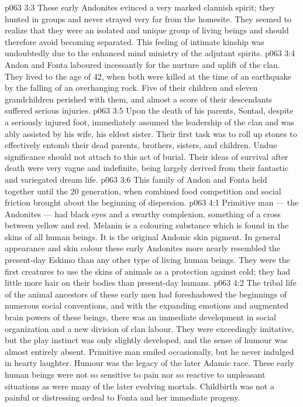 \vs p063 3:3 These early Andonites evinced a very marked clannish spirit; they hunted in groups and never strayed very far from the homesite. They seemed to realize that they were an isolated and unique group of living beings and should therefore avoid becoming separated. This feeling of intimate kinship was undoubtedly due to the enhanced mind ministry of the adjutant spirits.
\vs p063 3:4 \pc Andon and Fonta laboured incessantly for the nurture and uplift of the clan. They lived to the age of 42, when both were killed at the time of an earthquake by the falling of an overhanging rock. Five of their children and eleven grandchildren perished with them, and almost a score of their descendants suffered serious injuries.
\vs p063 3:5 Upon the death of his parents, Sontad, despite a seriously injured foot, immediately assumed the leadership of the clan and was ably assisted by his wife, his eldest sister. Their first task was to roll up stones to effectively entomb their dead parents, brothers, sisters, and children. Undue significance should not attach to this act of burial. Their ideas of survival after death were very vague and indefinite, being largely derived from their fantastic and variegated dream life.
\vs p063 3:6 \pc This family of Andon and Fonta held together until the 20 generation, when combined food competition and social friction brought about the beginning of dispersion.
\vs p063 4:1 Primitive man --- the Andonites --- had black eyes and a swarthy complexion, something of a cross between yellow and red. Melanin is a colouring substance which is found in the skins of all human beings. It is the original Andonic skin pigment. In general appearance and skin colour these early Andonites more nearly resembled the present\hyp{}day Eskimo than any other type of living human beings. They were the first creatures to use the skins of animals as a protection against cold; they had little more hair on their bodies than present\hyp{}day humans.
\vs p063 4:2 The tribal life of the animal ancestors of these early men had foreshadowed the beginnings of numerous social conventions, and with the expanding emotions and augmented brain powers of these beings, there was an immediate development in social organization and a new division of clan labour. They were exceedingly imitative, but the play instinct was only slightly developed, and the sense of humour was almost entirely absent. Primitive man smiled occasionally, but he never indulged in hearty laughter. Humour was the legacy of the later Adamic race. These early human beings were not so sensitive to pain nor so reactive to unpleasant situations as were many of the later evolving mortals. Childbirth was not a painful or distressing ordeal to Fonta and her immediate progeny.
